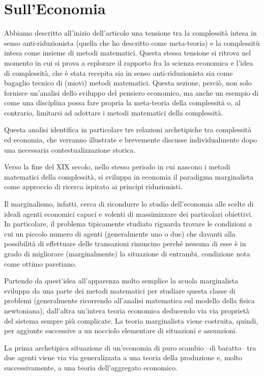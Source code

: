 \documentclass[a4paper, headings=standardclasses]{scrartcl}
\begin{document}
\section{Sull'Economia}
Abbiamo descritto all'inizio dell'articolo una tensione tra la complessità intesa in senso anti-riduzionista (quella che ho descritto come meta-teoria) e la complessitù intesa come insieme di metodi matematici.
Questa stessa tensione si ritrova nel momento in cui si prova a esplorare il rapporto fra la scienza economica e l'idea di complessità, che è stata recepita sia in senso anti-riduzionista sia come bagaglio tecnico di (nuovi) metodi matematici.
Questa sezione, perciò, non solo fornisce un'analisi dello sviluppo del pensiero economico, ma anche un esempio di come una disciplina possa fare propria la meta-teoria della complessità o, al contrario, limitarsi ad adottare i metodi matematici della complessità.

Questa analisi identifica in particolare tre relazioni archetipiche tra complessità ed economia, che verranno illustrate e brevemente discusse individualmente dopo una necessaria contestualizzazione storica.

Verso la fine del XIX secolo, nello stesso periodo in cui nascono i metodi matematici della complessità, si sviluppa in economia il paradigma marginalista come approccio di ricerca ispirato ai principi riduzionisti.

Il marginalismo, infatti, cerca di ricondurre lo studio dell'economia alle scelte di ideali agenti economici capaci e volenti di massimizzare dei particolari obiettivi.
In particolare, il problema tipicamente studiato riguarda trovare le condizioni a cui un piccolo numero di agenti (generalmente uno o due) che davanti alla possibilità di effettuare delle transazioni rinuncino perché nessuna di esse è in grado di migliorare (marginalmente) la situazione di entrambi, condizione nota come ottimo paretiano.

Partendo da quest'idea all'apparenza molto semplice la scuola marginalista sviluppa da una parte dei metodi matematici per studiare questa classe di problemi (generalmente ricorrendo all'analisi matematica sul modello della fisica newtoniana), dall'altra un'intera teoria economica deducendo via via proprietà del sistema sempre più complicate.
La teoria marginalista viene costruita, quindi, per aggiunte successive a un nocciolo elementare di situazioni e assunzioni.

La prima archetipica situazione di un'economia di puro scambio --di baratto-- tra due agenti viene via via generalizzata a una teoria della produzione e, molto successivamente, a una teoria dell'aggregato economico.
\end{document}
